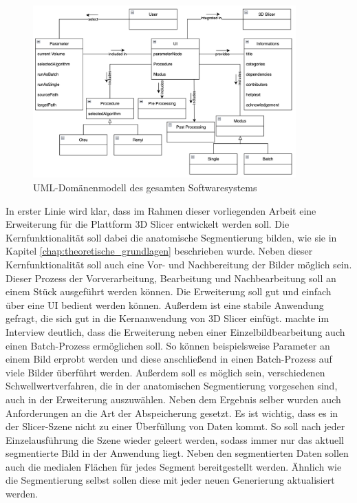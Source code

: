 \begin{figure}[h]
	\centering
	\includegraphics[width=0.9\textwidth]{img/domaene.png}
	\caption{UML-Domänenmodell des gesamten Softwaresystems}
	\label{fig:3d_slicer_domäne}
\end{figure}

In erster Linie wird klar, dass im Rahmen dieser vorliegenden Arbeit eine Erweiterung
für die Plattform 3D Slicer entwickelt werden soll. Die Kernfunktionalität soll
dabei die anatomische Segmentierung bilden, wie sie in Kapitel \ref{chap:theoretische_grundlagen}
beschrieben wurde. Neben dieser Kernfunktionalität soll auch eine Vor- und Nachbereitung
der Bilder möglich sein. Dieser Prozess der Vorverarbeitung, Bearbeitung und Nachbearbeitung
soll an einem Stück ausgeführt werden können. Die Erweiterung soll gut und
einfach über eine \ac{UI} bedient werden können. Außerdem ist eine stabile
Anwendung gefragt, die sich gut in die Kernanwendung von 3D Slicer einfügt.
\citet[]{walter2025} machte im Interview deutlich, dass die Erweiterung neben
einer Einzelbildbearbeitung auch einen Batch-Prozess ermöglichen soll. So können
beispielsweise Parameter an einem Bild erprobt werden und diese anschließend in einen
Batch-Prozess auf viele Bilder überführt werden. Außerdem soll es möglich sein, verschiedenen
Schwellwertverfahren, die in der anatomischen Segmentierung vorgesehen sind, auch
in der Erweiterung auszuwählen. Neben dem Ergebnis selber wurden auch
Anforderungen an die Art der Abspeicherung gesetzt. Es ist wichtig, dass es in
der Slicer-Szene nicht zu einer Überfüllung von Daten kommt. So soll nach jeder Einzelausführung
die Szene wieder geleert werden, sodass immer nur das aktuell segmentierte Bild
in der Anwendung liegt. Neben den segmentierten Daten sollen auch die medialen Flächen
für jedes Segment bereitgestellt werden. Ähnlich wie die Segmentierung selbst
sollen diese mit jeder neuen Generierung aktualisiert werden.

